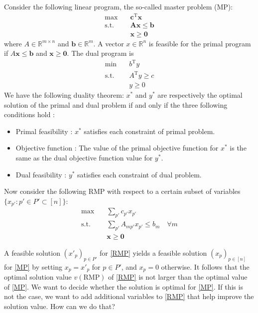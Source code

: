 Consider the
following linear program, the so-called master problem (MP):
\begin{equation}\label{MP}\begin{aligned}
\max \quad &\boldsymbol{c}^{\mathrm{T}} \boldsymbol{x}\\
\text {s.t. } \quad& \boldsymbol{Ax} \leq \boldsymbol{b}\\
&\boldsymbol{x} \geq \mathbf{0}
\end{aligned}\tag{MP}\end{equation}
where $A \in \mathbb{R}^{m \times n}$ and $\boldsymbol{b} \in \mathbb{R}^{m} .$ A vector $x \in \mathbb{R}^{n}$ is feasible for the primal program if $A \boldsymbol{x} \leq \boldsymbol{b}$ and $\boldsymbol{x} \geq \mathbf{0} .$ The dual program is
\begin{equation}\label{D-MP}\begin{aligned}
\min \quad & b^{\mathrm{T}} y \\
\text {s.t. }\quad & A^{\mathrm{T}} y \geq c \\
& y \geq 0
\end{aligned}\tag{D-MP}\end{equation}
We have the following duality theorem: $x^*$ and $y^*$ are
respectively the optimal solution of the primal and dual problem if and
only if the three following conditions hold :
\begin{itemize}
    \item Primal feasibility : $x^*$ satisfies each constraint of primal problem.
    \item Objective function : The value of the primal objective function for $x^*$ is the same as the
dual objective function value for $y^*$.
    \item Dual feasibility : $y^*$ satisfies each constraint of dual problem.
\end{itemize}

Now consider the following RMP with respect to a certain subset of variables $\{x_{p'}:p'\in P' \subset [n]\}$:
\begin{equation}\label{RMP}\begin{aligned}
\max \quad &\sum_{p'}c_{p'}x_{p'}\\
\text {s.t. } \quad& \sum_{p'}A_{mp'}x_{p'} \leq b_m\quad \forall m \\
&\boldsymbol{x} \geq \mathbf{0}
\end{aligned}\tag{RMP}\end{equation}

A feasible solution $(x'_{p})_{p\in P'}$ for \eqref{RMP} yields a feasible solution $(x_{p})_{p\in [n]}$ for \eqref{MP} by setting $x_{p}=x'_{p}$ for $p\in P'$, and $x_{p}=0 $ otherwise.  It follows
that the optimal solution value $v(\text{RMP})$ of \eqref{RMP} is not larger than the optimal value of \eqref{MP}. We want to
decide whether the solution is optimal for \eqref{MP}. If this is not the
case, we want to add additional variables to \eqref{RMP}  that help improve the
solution value. How can we do that?



